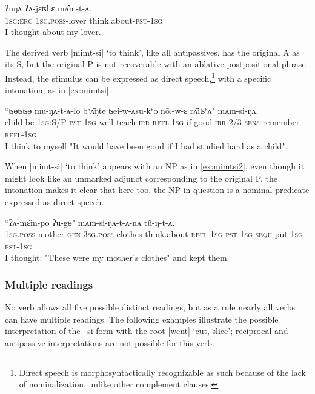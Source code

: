 \documentclass[twoside,a4paper,11pt]{article}
\newcommand{\ipa}[1]{{\phon#1}}
\begin{document}
\begin{exe}
\ex \label{ex:mamta}
\gll
\ipa{ʔuŋʌ} 	\ipa{ʔʌ-jɛʦhɛ} 	\ipa{mʌ̂m-t-ʌ.} \\
\textsc{1sg:erg} \textsc{1sg.poss}-lover think.about-\textsc{pst-1sg} \\
\glt I thought about my lover.
\end{exe}

The derived verb |\ipa{mimt-si}| `to think', like all antipassives, has the original A as its S, but the original P is not recoverable with an ablative postpositional phrase. Instead, the stimulus can be expressed as direct speech,\footnote{Direct speech is morphosyntactically recognizable as such because of the lack of nominalization, unlike other complement clauses.} with a specific intonation, as in \ref{ex:mimtsi}.

\begin{exe}
\ex \label{ex:mimtsi}
\gll ``\ipa{ʦɵʦʦɵ}  	\ipa{mu-ŋʌ-t-ʌ-lo}  	\ipa{bʰʌ̄ŋte}  	\ipa{ʦei-w-ʌsu-kʰo}  	\ipa{nōː-w-ɛ}  	\ipa{rʌ̄iʦʰʌ}"  	\ipa{mʌm-si-ŋʌ.}  \\
child be-\textsc{1sg:S/P-pst-1sg} well teach-\textsc{irr-refl:1sg}-if good-\textsc{irr-2/3} \textsc{sens} remember-\textsc{refl-1sg} \\
\glt  I think to myself "It would have been good if I had studied hard as a child".
\end{exe}

When |\ipa{mimt-si}| `to think' appears with an NP as in  \ref{ex:mimtsi2}, even though it might look like an unmarked adjunct corresponding to the original P, the intonation makes it clear that here too, the NP in question is a nominal predicate expressed as direct speech.

\begin{exe}
\ex \label{ex:mimtsi2}
\gll 
``\ipa{ʔʌ-mɛ̂m-po} 	\ipa{ʔu-gɵ}" 	\ipa{mʌm-si-ŋʌ-t-ʌ-nʌ} 	\ipa{tû-ŋ-t-ʌ.}
 \\
 \textsc{1sg.poss}-mother-\textsc{gen} \textsc{3sg.poss}-clothes think.about-\textsc{refl-1sg-pst-1sg-sequ} put-\textsc{1sg-pst-1sg} \\
\glt I thought: "These were my mother's clothes" and kept them.
\end{exe}
 
 
  
 
 \subsubsection{Multiple readings}  
No verb allows all five possible  distinct readings, but as a rule nearly all verbs can have multiple readings. The following examples illustrate the possible interpretation of the \ipa{--si} form with the root |\ipa{went}| `cut, slice';  reciprocal and antipassive interpretations are not possible for this verb.
\end{document}
